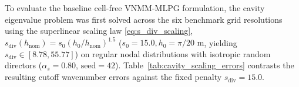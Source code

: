 \documentclass[VANCOUVER,Times1COL]{WileyNJD-v5}
\begin{document}
To evaluate the baseline cell-free VNMM-MLPG formulation, the cavity eigenvalue problem was first solved across the six benchmark grid resolutions using the superlinear scaling law \eqref{eq:s_div_scaling}, $s_{\mathrm{div}}(h_{\mathrm{nom}}) = s_0 (h_0 / h_{\mathrm{nom}})^{1.5}$ ($s_0 = 15.0, h_0 = \pi/20\text{ m}$, yielding $s_{\mathrm{div}} \in [8.78, 55.77]$) on regular nodal distributions with isotropic random directors ($\alpha_s = 0.80$, $\text{seed}=42$). Table~\ref{tab:cavity_scaling_errors} contrasts the resulting cutoff wavenumber errors against the fixed penalty $s_{\mathrm{div}} = 15.0$.

\begin{table}[!t]
    \centering
    \small
    \caption{Cavity eigenvalue cutoff wavenumber error comparison on the 2D PEC resonant cavity across the six grid resolutions from \cite{stable_vnmm2d_2026}: fixed penalty ($s_{\mathrm{div}} = 15.0$) vs. superlinear $h_{\mathrm{nom}}$-scaled penalty ($s_{\mathrm{div}}(h_{\mathrm{nom}}) = s_0(h_0/h_{\mathrm{nom}})^{1.5}$, $s_{\mathrm{div}} \in [8.78, 55.77]$) with isotropic random directors ($\alpha_s = 0.80$, $\text{seed}=42$).}
    \label{tab:cavity_scaling_errors}
\end{table}
\end{document}
